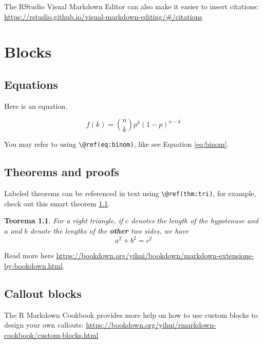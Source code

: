 \documentclass[
  12pt,
]{book}
\newtheorem{theorem}{Teorema}[chapter]
\theoremstyle{definition}
\theoremstyle{definition}
\theoremstyle{definition}
\theoremstyle{definition}
\theoremstyle{remark}
\begin{document}
The RStudio Visual Markdown Editor can also make it easier to insert citations: \url{https://rstudio.github.io/visual-markdown-editing/\#/citations}

\hypertarget{blocks}{%
\chapter{Blocks}\label{blocks}}

\hypertarget{equations}{%
\section{Equations}\label{equations}}

Here is an equation. 

\begin{equation} 
  f\left(k\right) = \binom{n}{k} p^k\left(1-p\right)^{n-k}
  \label{eq:binom}
\end{equation}

You may refer to using \texttt{\textbackslash{}@ref(eq:binom)}, like see Equation \eqref{eq:binom}.

\hypertarget{theorems-and-proofs}{%
\section{Theorems and proofs}\label{theorems-and-proofs}}

Labeled theorems can be referenced in text using \texttt{\textbackslash{}@ref(thm:tri)}, for example, check out this smart theorem \ref{thm:tri}.

\begin{theorem}
\protect\hypertarget{thm:tri}{}\label{thm:tri}For a right triangle, if \(c\) denotes the \emph{length} of the hypotenuse
and \(a\) and \(b\) denote the lengths of the \textbf{other} two sides, we have
\[a^2 + b^2 = c^2\]
\end{theorem}

Read more here \url{https://bookdown.org/yihui/bookdown/markdown-extensions-by-bookdown.html}.

\hypertarget{callout-blocks}{%
\section{Callout blocks}\label{callout-blocks}}

The R Markdown Cookbook provides more help on how to use custom blocks to design your own callouts: \url{https://bookdown.org/yihui/rmarkdown-cookbook/custom-blocks.html}
\end{document}
